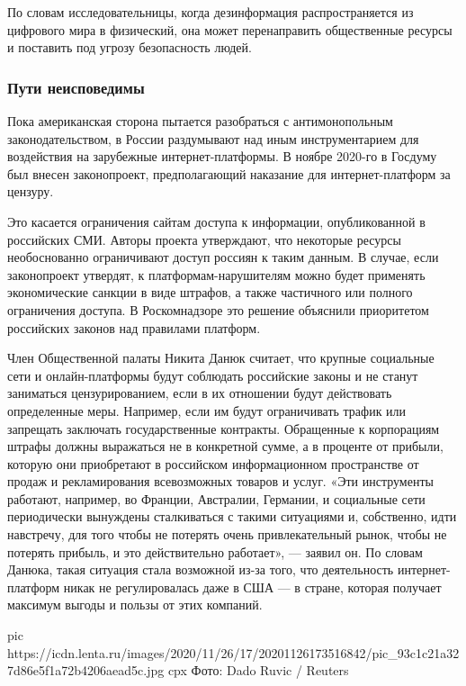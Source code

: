 По словам исследовательницы, когда дезинформация распространяется из цифрового
мира в физический, она может перенаправить общественные ресурсы и поставить под
угрозу безопасность людей.

\subsubsection{Пути неисповедимы}

Пока американская сторона пытается разобраться с антимонопольным
законодательством, в России раздумывают над иным инструментарием для
воздействия на зарубежные интернет-платформы. В ноябре 2020-го в Госдуму был
внесен законопроект, предполагающий наказание для интернет-платформ за цензуру.

Это касается ограничения сайтам доступа к информации, опубликованной в
российских СМИ. Авторы проекта утверждают, что некоторые ресурсы необоснованно
ограничивают доступ россиян к таким данным. В случае, если законопроект
утвердят, к платформам-нарушителям можно будет применять экономические санкции
в виде штрафов, а также частичного или полного ограничения доступа. В
Роскомнадзоре это решение объяснили приоритетом российских законов над
правилами платформ.

Член Общественной палаты Никита Данюк считает, что крупные социальные сети и
онлайн-платформы будут соблюдать российские законы и не станут заниматься
цензурированием, если в их отношении будут действовать определенные меры.
Например, если им будут ограничивать трафик или запрещать заключать
государственные контракты. Обращенные к корпорациям штрафы должны выражаться не
в конкретной сумме, а в проценте от прибыли, которую они приобретают в
российском информационном пространстве от продаж и рекламирования всевозможных
товаров и услуг. «Эти инструменты работают, например, во Франции, Австралии,
Германии, и социальные сети периодически вынуждены сталкиваться с такими
ситуациями и, собственно, идти навстречу, для того чтобы не потерять очень
привлекательный рынок, чтобы не потерять прибыль, и это действительно
работает», — заявил он. По словам Данюка, такая ситуация стала возможной из-за
того, что деятельность интернет-платформ никак не регулировалась даже в США — в
стране, которая получает максимум выгоды и пользы от этих компаний.

\ifcmt
pic https://icdn.lenta.ru/images/2020/11/26/17/20201126173516842/pic_93c1c21a327d86e5f1a72b4206aead5c.jpg
cpx Фото: Dado Ruvic / Reuters
\fi

